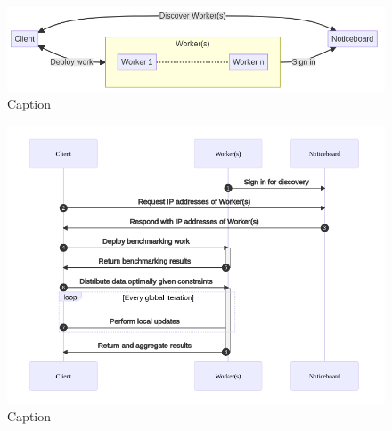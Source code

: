 \documentclass[../mthe-493-final-project.tex]{subfiles}
\begin{document}
    
    \section{}
    
    \begin{figure}
        \centering
        \includegraphics{thesis/img/network-1.png}
        \caption{Caption}
        \label{fig:network-flowchart}
    \end{figure}
    
    \begin{figure}
        \centering
        \includegraphics{thesis/img/network-2.png}
        \caption{Caption}
        \label{fig:network-sequence}
    \end{figure}
    
\end{document}
